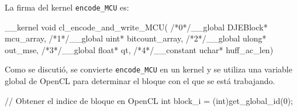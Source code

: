 La firma del kernel \verb+encode_MCU+ es:


\begin{code}[language=C][h]
__kernel void
cl_encode_and_write_MCU(
    /*0*/__global DJEBlock* mcu_array,
    /*1*/__global uint* bitcount_array,
    /*2*/__global ulong* out_mse,
    /*3*/__global float* qt,
    /*4*/__constant uchar* huff_ac_len)
\end{code}

Como se discutió, se convierte \verb+encode_MCU+ en un kernel y se utiliza una
variable global de OpenCL para determinar el bloque con el que se está
trabajando.

\begin{code}[language=C][h]
    // Obtener el indice de bloque en OpenCL
    int block_i = (int)get_global_id(0);
\end{code}
